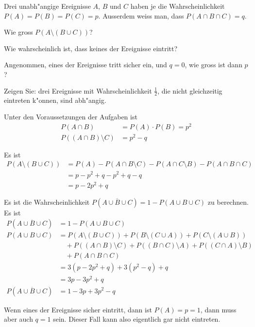 Drei unabh"angige Ereignisse $A$, $B$ und $C$ haben je die Wahrscheinlichkeit
$P(A)=P(B)=P(C)=p$. Ausserdem weiss man, dass $P(A\cap B\cap C)=q$.
\begin{teilaufgaben}
\item Wie gross $P(A\setminus(B\cup C))$?
\item Wie wahrscheinlich ist, dass keines der Ereignisse eintritt?
\item Angenommen, eines der Ereignisse tritt sicher ein, und $q=0$,
wie gross ist dann $p$?
\item Zeigen Sie: drei Ereignisse mit Wahrscheinlichkeit $\frac12$,
die nicht gleichzeitig eintreten k"onnen, sind abh"angig.
\end{teilaufgaben}

\begin{loesung}
Unter den Voraussetzungen der Aufgaben ist
\begin{align*}
P(A\cap B)&=P(A)\cdot P(B) = p^2\\
P((A\cap B)\setminus C)&=p^2-q
\end{align*}
\begin{teilaufgaben}
\item Es ist
\begin{align*}
P(A\setminus (B\cup C))
&=
P(A) - P(A\cap B\setminus C) - P(A\cap C\setminus B)-P(A\cap B\cap C)
\\
&=p-p^2+q-p^2+q-q
\\
&=p-2p^2+q
\end{align*}
\item
Es ist die Wahrscheinlichkeit $P(\overline{A\cup B\cup C}) = 1-P(A\cup B\cup C)$ zu berechnen.
Es ist
\begin{align*}
P(\overline{A\cup B\cup C})
&=
1-P(A\cup B \cup C)\\
P(A\cup B \cup C)
&=
P(A\setminus(B\cup C))
+P(B\setminus(C\cup A))
+P(C\setminus(A\cup B))
\\
&\quad
+P((A\cap B)\setminus C)
+P((B\cap C)\setminus A)
+P((C\cap A)\setminus B)
\\
&\quad
+P(A\cap B\cap C)
\\
&=3(p-2p^2+q)+3(p^2-q)+q
\\
&=3p-3p^2+q
\\
P(\overline{A\cup B\cup C})
&=
1-3p+3p^2-q
\end{align*}
\item
Wenn eines der Ereignisse sicher eintritt, dann ist $P(A)=p=1$, dann muss
aber auch $q=1$ sein. Dieser Fall kann also eigentlich gar nicht
eintreten.


\end{teilaufgaben}
\end{loesung}

